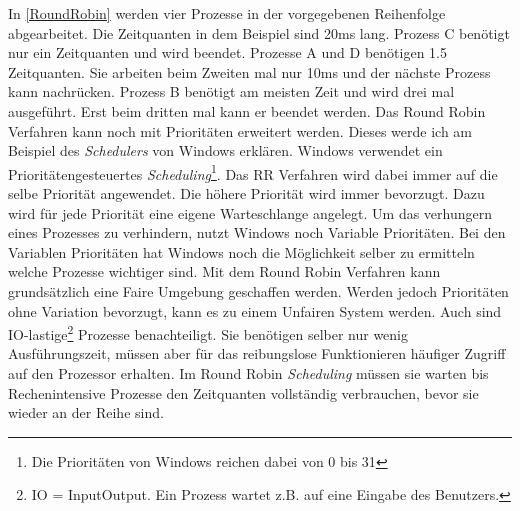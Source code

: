 In \ref{RoundRobin} werden vier Prozesse in der vorgegebenen Reihenfolge abgearbeitet. Die Zeitquanten in dem Beispiel sind 20ms lang. Prozess C benötigt nur ein Zeitquanten und wird beendet. Prozesse A und D benötigen 1.5 Zeitquanten. Sie arbeiten beim Zweiten mal nur 10ms und der nächste Prozess kann nachrücken. Prozess B benötigt am meisten Zeit und wird drei mal ausgeführt. Erst beim dritten mal kann er beendet werden.
\medskip
\newline
Das Round Robin Verfahren kann noch mit Prioritäten erweitert werden. Dieses werde ich am Beispiel des \textit{Schedulers} von Windows erklären. Windows verwendet ein Prioritätengesteuertes \textit{Scheduling}\footnote{Die Prioritäten von Windows reichen dabei von 0 bis 31}. Das RR Verfahren wird dabei immer auf die selbe Priorität angewendet. Die höhere Priorität wird immer bevorzugt. Dazu wird für jede Priorität eine eigene Warteschlange angelegt. Um das verhungern eines Prozesses zu verhindern, nutzt Windows noch Variable Prioritäten. Bei den Variablen Prioritäten hat Windows noch die Möglichkeit selber zu ermitteln welche Prozesse wichtiger sind.\cite[Folie 9-12]{Windows:Lohmann}
\medskip
\newline
Mit dem Round Robin Verfahren kann grundsätzlich eine Faire Umgebung geschaffen werden. Werden jedoch Prioritäten ohne Variation bevorzugt, kann es zu einem Unfairen System werden. Auch sind I\/O-lastige\footnote{I\/O = Input\/Output. Ein Prozess wartet z.B. auf eine Eingabe des Benutzers.} Prozesse benachteiligt. Sie benötigen selber nur wenig Ausführungszeit, müssen aber für das reibungslose Funktionieren häufiger Zugriff auf den Prozessor erhalten. Im Round Robin \textit{Scheduling} müssen sie warten bis Rechenintensive Prozesse den Zeitquanten vollständig verbrauchen, bevor sie wieder an der Reihe sind.

